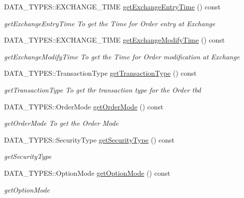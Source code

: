 \begin{DoxyCompactItemize}
D\-A\-T\-A\-\_\-\-T\-Y\-P\-E\-S\-::\-E\-X\-C\-H\-A\-N\-G\-E\-\_\-\-T\-I\-M\-E \hyperlink{class_a_p_i2_1_1_single_order_aef1b4d951031f241bb085ae45377ca15}{get\-Exchange\-Entry\-Time} () const 
\begin{DoxyCompactList}\small\item\em get\-Exchange\-Entry\-Time To get the Time for Order entry at Exchange \end{DoxyCompactList}\item 
D\-A\-T\-A\-\_\-\-T\-Y\-P\-E\-S\-::\-E\-X\-C\-H\-A\-N\-G\-E\-\_\-\-T\-I\-M\-E \hyperlink{class_a_p_i2_1_1_single_order_a1fdd8bbb3e497f3172466e0957fdd16f}{get\-Exchange\-Modify\-Time} () const 
\begin{DoxyCompactList}\small\item\em get\-Exchange\-Modify\-Time To get the Time for Order modification at Exchange \end{DoxyCompactList}\item 
D\-A\-T\-A\-\_\-\-T\-Y\-P\-E\-S\-::\-Transaction\-Type \hyperlink{class_a_p_i2_1_1_single_order_adeec84f5228d3392fed271ae20196edf}{get\-Transaction\-Type} () const 
\begin{DoxyCompactList}\small\item\em get\-Transaction\-Type To get thr transaction type for the Order tbd \end{DoxyCompactList}\item 
D\-A\-T\-A\-\_\-\-T\-Y\-P\-E\-S\-::\-Order\-Mode \hyperlink{class_a_p_i2_1_1_single_order_aace36f50716b3e08ecc237781b3246b8}{get\-Order\-Mode} () const 
\begin{DoxyCompactList}\small\item\em get\-Order\-Mode To get the Order Mode \end{DoxyCompactList}\item 
D\-A\-T\-A\-\_\-\-T\-Y\-P\-E\-S\-::\-Security\-Type \hyperlink{class_a_p_i2_1_1_single_order_a6bec3cce7cb07ed8347dbdb49e494bca}{get\-Security\-Type} () const 
\begin{DoxyCompactList}\small\item\em get\-Security\-Type \end{DoxyCompactList}\item 
D\-A\-T\-A\-\_\-\-T\-Y\-P\-E\-S\-::\-Option\-Mode \hyperlink{class_a_p_i2_1_1_single_order_a5621f5611f1b007691b159fc5cdcecba}{get\-Option\-Mode} () const 
\begin{DoxyCompactList}\small\item\em get\-Option\-Mode \end{DoxyCompactList}\item 

\end{DoxyCompactItemize}
